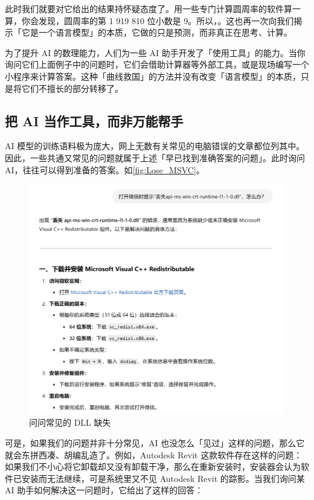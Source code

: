此时我们就要对它给出的结果持怀疑态度了。用一些专门计算圆周率的软件算一算，你会发现，圆周率的第 1 919 810 位小数是 9。所以，。这也再一次向我们揭示「它是一个语言模型」的本质，它做的只是预测，而非真正在思考、计算。

\begin{note}
  为了提升 AI 的数理能力，人们为一些 AI 助手开发了「使用工具」的能力。当你询问它们上面例子中的问题时，它们会借助计算器等外部工具，或是现场编写一个小程序来计算答案。这种「曲线救国」的方法并没有改变「语言模型」的本质，只是将它们不擅长的部分转移了。
\end{note}

\subsection{把 AI 当作工具，而非万能帮手}

AI 模型的训练语料极为庞大，网上无数有关常见的电脑错误的文章都位列其中。因此，一些共通又常见的问题就属于上述「早已找到准确答案的问题」。此时询问 AI，往往可以得到准备的答案。如\autoref{fig:Lose_MSVC}。

\begin{figure}[htb!]
  \centering
  \includegraphics[width=.6\textwidth]{assets/basic/Lose_MSVC.png}
  \caption{问问常见的 DLL 缺失}
  \label{fig:Lose_MSVC}
\end{figure}

可是，如果我们的问题并非十分常见，AI 也没怎么「见过」这样的问题，那么它就会东拼西凑、胡编乱造了。例如，Autodesk Revit 这款软件存在这样的问题：如果我们不小心将它卸载却又没有卸载干净，那么在重新安装时，安装器会认为软件已安装而无法继续，可是系统里又不见 Autodesk Revit 的踪影。当我们询问某 AI 助手如何解决这一问题时，它给出了这样的回答：

